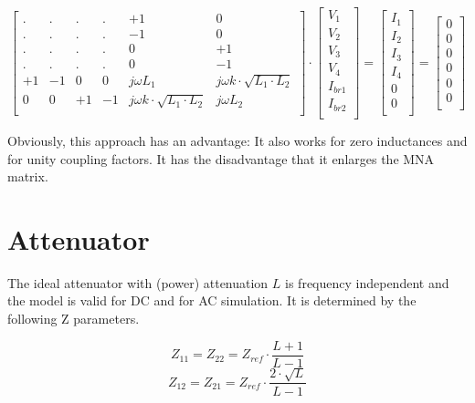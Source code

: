 \begin{equation}
\begin{bmatrix}
. & . & . & . & +1 &  0\\
. & . & . & . & -1 &  0\\
. & . & . & . &  0 & +1\\
. & . & . & . &  0 & -1\\
+1 & -1 & 0 & 0 & j\omega L_1 & j\omega k\cdot\sqrt{L_1\cdot L_2} \\
0 & 0 & +1 & -1 & j\omega k\cdot\sqrt{L_1\cdot L_2} & j\omega L_2 \\
\end{bmatrix}
\cdot
\begin{bmatrix}
V_1\\
V_2\\
V_3\\
V_4\\
I_{br1}\\
I_{br2}\\
\end{bmatrix}
=
\begin{bmatrix}
I_1\\
I_2\\
I_3\\
I_4\\
0\\
0\\
\end{bmatrix}
=
\begin{bmatrix}
0\\
0\\
0\\
0\\
0\\
0\\
\end{bmatrix}
\end{equation}

Obviously, this approach has an advantage: It also works for zero
inductances and for unity coupling factors. It has the disadvantage
that it enlarges the MNA matrix.


\section{Attenuator}
\label{sec:dc_attenuator}

The ideal attenuator with (power) attenuation $L$ is frequency
independent and the model is valid for DC and for AC simulation.
It is determined by the following Z parameters.

\begin{equation}
Z_{11} = Z_{22} = Z_{ref}\cdot\frac{L+1}{L-1}
\end{equation}
\begin{equation}
Z_{12} = Z_{21} = Z_{ref}\cdot\frac{2\cdot\sqrt{L}}{L-1}
\end{equation}

